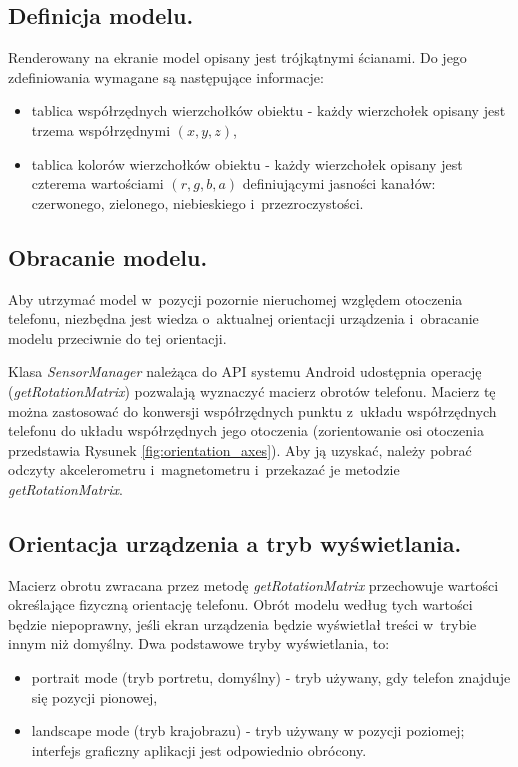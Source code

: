 \documentclass[a4paper,twocolumn,11pt]{article}
\begin{document}
\subsection{Definicja modelu.}
 Renderowany na ekranie model opisany jest trójkątnymi ścianami.
 Do jego zdefiniowania wymagane są następujące informacje:

 \begin{itemize}
  \item tablica współrzędnych wierzchołków obiektu - każdy wierzchołek opisany jest trzema współrzędnymi $(x, y, z)$,
  \item tablica kolorów wierzchołków obiektu - każdy wierzchołek opisany jest czterema wartościami $(r, g, b, a)$ definiującymi jasności kanałów: czerwonego, zielonego, niebieskiego i~przezroczystości.
 \end{itemize}


\subsection{Obracanie modelu.}
 Aby utrzymać model w~pozycji pozornie nieruchomej względem otoczenia telefonu, niezbędna jest wiedza o~aktualnej orientacji urządzenia i~obracanie modelu przeciwnie do tej orientacji.
 
 Klasa \emph{SensorManager} należąca do API systemu Android udostępnia operację (\emph{getRotationMatrix}) pozwalają wyznaczyć macierz obrotów telefonu.
 Macierz tę można zastosować do konwersji współrzędnych punktu z~układu współrzędnych telefonu do układu współrzędnych jego otoczenia (zorientowanie osi otoczenia przedstawia Rysunek \ref{fig:orientation_axes}).
 Aby ją uzyskać, należy pobrać odczyty akcelerometru i~magnetometru i~przekazać je metodzie \emph{getRotationMatrix}.


\subsection{Orientacja urządzenia a tryb wyświetlania.}
 Macierz obrotu zwracana przez metodę \emph{getRotationMatrix} przechowuje wartości określające fizyczną orientację telefonu.
 Obrót modelu według tych wartości będzie niepoprawny, jeśli ekran urządzenia będzie wyświetlał treści w~trybie innym niż domyślny.
 Dwa podstawowe tryby wyświetlania, to:
 \begin{itemize}
  \item portrait mode (tryb portretu, domyślny) - tryb używany, gdy telefon znajduje się pozycji pionowej,
  \item landscape mode (tryb krajobrazu) - tryb używany w pozycji poziomej; interfejs graficzny aplikacji jest odpowiednio obrócony.
 \end{itemize}
 
\end{document}
